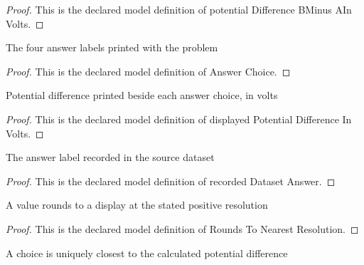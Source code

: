 \begin{proof}
  This is the declared model definition of potential Difference BMinus AIn Volts.
\end{proof}
\begin{definition}
  \label{def:physics:phyx-mini-0867:phyxminiproblems-problemphyxmini0867-answerchoice}
  The four answer labels printed with the problem
\end{definition}
\begin{proof}
  This is the declared model definition of Answer Choice.
\end{proof}
\begin{definition}
  \label{def:physics:phyx-mini-0867:phyxminiproblems-problemphyxmini0867-displayedpotentialdifferenceinvolts}
  Potential difference printed beside each answer choice, in volts
\end{definition}
\begin{proof}
  This is the declared model definition of displayed Potential Difference In Volts.
\end{proof}
\begin{definition}
  \label{def:physics:phyx-mini-0867:phyxminiproblems-problemphyxmini0867-recordeddatasetanswer}
  The answer label recorded in the source dataset
\end{definition}
\begin{proof}
  This is the declared model definition of recorded Dataset Answer.
\end{proof}
\begin{definition}
  \label{def:physics:phyx-mini-0867:phyxminiproblems-problemphyxmini0867-roundstonearestresolution}
  A value rounds to a display at the stated positive resolution
\end{definition}
\begin{proof}
  This is the declared model definition of Rounds To Nearest Resolution.
\end{proof}
\begin{definition}
  \label{def:physics:phyx-mini-0867:phyxminiproblems-problemphyxmini0867-isuniqueclosestdisplayedanswer}
  A choice is uniquely closest to the calculated potential difference
\end{definition}

